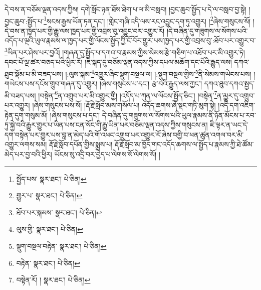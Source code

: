 དེ་བས་ན་བཅོམ་ལྡན་འདས་ཀྱིས། དགེ་སློང་ཉན་ཐོས་ཐེག་པ་ལ་མི་བསླབ། །བྱང་ཆུབ་སྤྱོད་པ་དེ་ལ་བསླབ་བྱ་སྟེ། །བྱང་ཆུབ་:སྤྱོད་པ་\footnote{སྤྱོད་པས་  སྣར་ཐང་།  པེ་ཅིན། }སངས་རྒྱས་ཡོན་ཏན་དང་། །གླེང་གཞི་འདི་ལས་རང་འབྱུང་དག་ཏུ་འགྱུར། །\footnote{གྱུར་པ་  སྣར་ཐང་།  པེ་ཅིན། }ཞེས་གསུངས་སོ། །དེ་བས་ན་ཁྱད་པར་གྱི་རྒྱུ་ལས་ཁྱད་པར་གྱི་འབྲས་བུ་འབྱུང་བར་འགྱུར་རོ། །དེ་བཞིན་དུ་གཟུགས་ལ་སོགས་པའི་འདོད་པ་ལྔའི་ཡུལ་རྣམས་ལ་ཁྱད་པར་གྱི་ལོངས་སྤྱོད་ཀྱི་ངོ་བོར་གྱུར་པས་ཁྱད་པར་གྱི་འབྲས་བུ་:ཐོབ་པར་འགྱུར་བ་\footnote{ཐོབ་པར་སྐམས་  སྣར་ཐང་།  པེ་ཅིན། }ཡིན་པར་ཤེས་པར་བྱའོ། །གཞན་དུ་སྤྱོད་པ་དཀའ་བ་རྣམས་ཀྱིས་སེམས་རྩེ་གཅིག་པ་འཐོབ་པར་མི་འགྱུར་ཏེ། དབང་པོ་ལྔ་ཚར་བཅད་པའི་ཕྱིར་རོ། །ཇི་སྐད་དུ་བཅོམ་ལྡན་འདས་ཀྱིས་དཔལ་མཆོག་དང་པོའི་རྒྱུད་ལས། དཀའ་ཐུབ་སྡོམ་པ་མི་བཟད་པས། །:ལུས་སྐམ་\footnote{ལུས་གྱི་  སྣར་ཐང་།  པེ་ཅིན། }འགྱུར་ཞིང་སྡུག་བསྔལ་ལ། །:སྡུག་བསྔལ་གྱིས་\footnote{སྡུག་བསྔལ་བརྟེན་  སྣར་ཐང་།  པེ་ཅིན། }ནི་སེམས་གཡེངས་པས། །གཡེངས་པས་དངོས་གྲུབ་གཞན་དུ་འགྱུར། །ཞེས་གསུངས་པ་དང་། རྩ་བའི་རྒྱུད་ལས་ཀྱང་། དཀའ་ཐུབ་དཀའ་སྤྱད་མི་བཟད་པས། །བསྟེན་\footnote{བརྟེན་  སྣར་ཐང་།  པེ་ཅིན། }ན་འགྲུབ་པར་མི་འགྱུར་གྱི། །འདོད་པ་ཀུན་ལ་ལོངས་སྤྱོད་ཅིང་། །བསྟེན་\footnote{བསྟེན་རོ། །  སྣར་ཐང་།  པེ་ཅིན། }ན་མྱུར་དུ་འགྲུབ་པར་འགྱུར། །ཞེས་གསུངས་པས་སོ། །རྡོ་རྗེ་སློབ་མས་གསོལ་པ། འདོད་ཆགས་ཞེ་སྡང་གཏི་མུག་སྟེ། །འདི་དག་འཇིག་རྟེན་དུག་གསུམ་མོ། །ཞེས་གསུངས་པ་དང་། དེ་བཞིན་དུ་གཟུགས་ལ་སོགས་པའི་ཡུལ་རྣམས་ནི་ཉོན་མོངས་པ་རབ་ཏུ་སྐྱེ་བའི་རྒྱུར་གྱུར་པ་ཡིན་པས་ངན་སོང་གི་རྒྱུ་ཡིན་པར་བཅོམ་ལྡན་འདས་ཀྱིས་གསུངས་ན། ཇི་ལྟར་ན་ཡང་དེ་དག་བསྟེན་པར་གྱུར་པས་བླ་ན་མེད་པའི་གོ་འཕང་འགྲུབ་པར་འགྱུར་རོ་ཞེས་བགྱི་བ་ཕན་ཚུན་འགལ་བར་མི་འགྱུར་ལགས་སམ། རྡོ་རྗེ་སློབ་དཔོན་གྱིས་སྨྲས་པ། རྡོ་རྗེ་སློབ་མ་ཁྱོད་གང་འདོད་ཆགས་ལ་སྤྱོད་པ་རྣམས་ཀྱི་ཐེ་ཚོམ་མེད་པར་བྱ་བའི་ཕྱིར། ཡོངས་སུ་འདྲི་བར་བྱེད་པ་ལེགས་སོ་ལེགས་སོ། །
